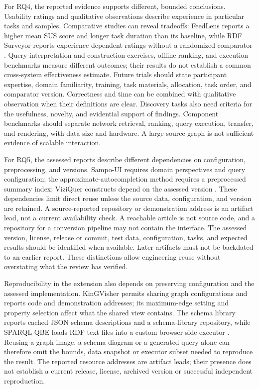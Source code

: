 \documentclass[manuscript,review,screen]{acmart}
\begin{document}
For RQ4, the reported evidence supports different, bounded conclusions. Usability ratings and qualitative observations describe experience in particular tasks and samples. Comparative studies can reveal tradeoffs: FeedLens reports a higher mean SUS score and longer task duration than its baseline, while RDF Surveyor reports experience-dependent ratings without a randomized comparator \citep{V3-01126,V3-01765}. Query-interpretation and construction exercises, offline ranking, and execution benchmarks measure different outcomes; their results do not establish a common cross-system effectiveness estimate. Future trials should state participant expertise, domain familiarity, training, task materials, allocation, task order, and comparator version. Correctness and time can be combined with qualitative observation when their definitions are clear. Discovery tasks also need criteria for the usefulness, novelty, and evidential support of findings. Component benchmarks should separate network retrieval, ranking, query execution, transfer, and rendering, with data size and hardware. A large source graph is not sufficient evidence of scalable interaction.

For RQ5, the assessed reports describe different dependencies on configuration, preprocessing, and versions. Sampo-UI requires domain perspectives and query configuration; the approximate-autocompletion method requires a preprocessed summary index; ViziQuer constructs depend on the assessed version \citep{2022_Ikkala_Sampo-UI_A,2021_Parra_Fast_Approximate,2018_Cerans_ViziQuer_A,V3-01013}. These dependencies limit direct reuse unless the source data, configuration, and version are retained. A source-reported repository or demonstration address is an artifact lead, not a current availability check. A reachable article is not source code, and a repository for a conversion pipeline may not contain the interface. The assessed version, license, release or commit, test data, configuration, tasks, and expected results should be identified when available. Later artifacts must not be backdated to an earlier report. These distinctions allow engineering reuse without overstating what the review has verified.

Reproducibility in the extension also depends on preserving configuration and the assessed implementation. KinGVisher permits sharing graph configurations and reports code and demonstration addresses; its maximum-edge setting and property selection affect what the shared view contains. The schema library reports cached JSON schema descriptions and a schema-library repository, while SPARQL-QBE loads RDF text files into a custom browser-side executor \citep{V3-01624,V3-00138,V3-02185}. Reusing a graph image, a schema diagram or a generated query alone can therefore omit the bounds, data snapshot or executor subset needed to reproduce the result. The reported resource addresses are artifact leads; their presence does not establish a current release, license, archived version or successful independent reproduction.
\end{document}
